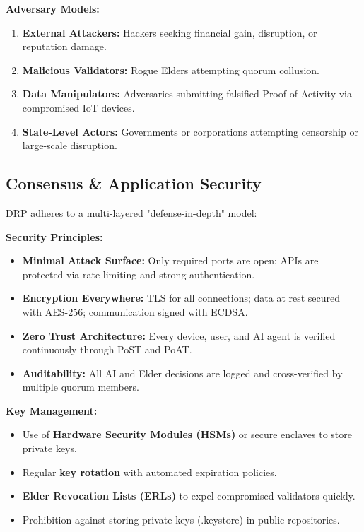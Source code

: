 \documentclass[11pt,a4paper]{article}
\begin{document}
\textbf{Adversary Models:}
\begin{enumerate}
    \item \textbf{External Attackers:} Hackers seeking financial gain, disruption, or reputation damage.
    \item \textbf{Malicious Validators:} Rogue Elders attempting quorum collusion.
    \item \textbf{Data Manipulators:} Adversaries submitting falsified Proof of Activity via compromised IoT devices.
    \item \textbf{State-Level Actors:} Governments or corporations attempting censorship or large-scale disruption.
\end{enumerate}

\subsection{Consensus \& Application Security}
DRP adheres to a multi-layered "defense-in-depth" model:

\textbf{Security Principles:}
\begin{itemize}
    \item \textbf{Minimal Attack Surface:} Only required ports are open; APIs are protected via rate-limiting and strong authentication.
    \item \textbf{Encryption Everywhere:} TLS for all connections; data at rest secured with AES-256; communication signed with ECDSA.
    \item \textbf{Zero Trust Architecture:} Every device, user, and AI agent is verified continuously through PoST and PoAT.
    \item \textbf{Auditability:} All AI and Elder decisions are logged and cross-verified by multiple quorum members.
\end{itemize}

\textbf{Key Management:}
\begin{itemize}
    \item Use of \textbf{Hardware Security Modules (HSMs)} or secure enclaves to store private keys.
    \item Regular \textbf{key rotation} with automated expiration policies.
    \item \textbf{Elder Revocation Lists (ERLs)} to expel compromised validators quickly.
    \item Prohibition against storing private keys (.keystore) in public repositories.
\end{itemize}
\end{document}
